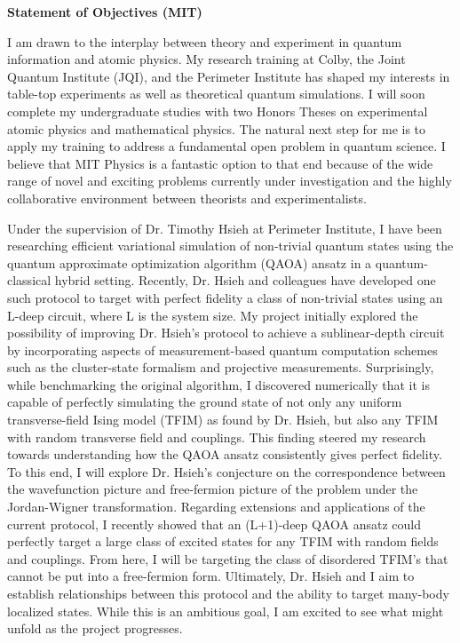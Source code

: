 \documentclass[12pt]{article}
\begin{document}
	
	
\begin{center}
	\textbf{Statement of Objectives (MIT)}
\end{center}\vspace{-5pt}	
I am drawn to the interplay between theory and experiment in quantum information and atomic physics. My research training at Colby, the Joint Quantum Institute (JQI), and the Perimeter Institute has shaped my interests in table-top experiments as well as theoretical quantum simulations. I will soon complete my undergraduate studies with two Honors Theses on experimental atomic physics and mathematical physics. The natural next step for me is to apply my training to address a fundamental open problem in quantum science. I believe that MIT Physics is a fantastic option to that end because of the wide range of novel and exciting problems currently under investigation and the highly collaborative environment between theorists and experimentalists.   \\ \vspace{-10pt}

Under the supervision of Dr. Timothy Hsieh at Perimeter Institute, I have been researching efficient variational simulation of non-trivial quantum states using the quantum approximate optimization algorithm (QAOA) ansatz in a quantum-classical hybrid setting. Recently, Dr. Hsieh and colleagues have developed one such protocol to target with perfect fidelity a class of non-trivial states using an L-deep circuit, where L is the system size. My project initially explored the possibility of improving Dr. Hsieh's protocol to achieve a sublinear-depth circuit by incorporating aspects of measurement-based quantum computation schemes such as the cluster-state formalism and projective measurements. Surprisingly, while benchmarking the original algorithm, I discovered numerically that it is capable of perfectly simulating the ground state of not only any uniform transverse-field Ising model (TFIM) as found by Dr. Hsieh, but also any TFIM with random transverse field and couplings. This finding steered my research towards understanding how the QAOA ansatz consistently gives perfect fidelity. To this end, I will explore Dr. Hsieh's conjecture on the correspondence between the wavefunction picture and free-fermion picture of the problem under the Jordan-Wigner transformation. Regarding extensions and applications of the current protocol, I recently showed that an (L+1)-deep QAOA ansatz could perfectly target a large class of excited states for any TFIM with random fields and couplings. From here, I will be targeting the class of disordered TFIM's that cannot be put into a free-fermion form. Ultimately, Dr. Hsieh and I aim to establish relationships between this protocol and the ability to target many-body localized states. While this is an ambitious goal, I am excited to see what might unfold as the project progresses. \\ \vspace{-10pt}
\end{document}
